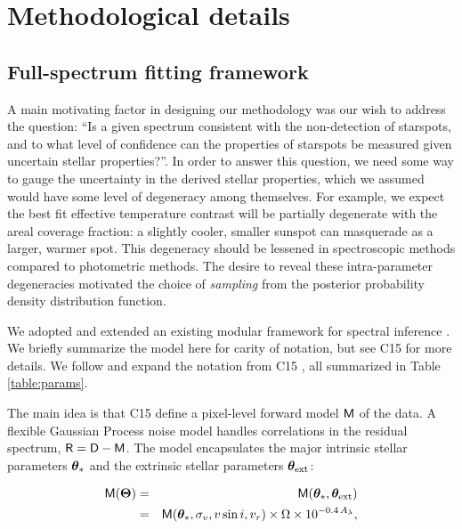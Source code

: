 \documentclass[twocolumn]{emulateapj}%
\newcommand{\iancze}{{\sc C15 }}
\begin{document}
\section{Methodological details}
\label{methods-details}

\subsection{Full-spectrum fitting framework}


A main motivating factor in designing our methodology was our wish to address the question: ``Is a given spectrum consistent with the non-detection of starspots, and to what level of confidence can the properties of starspots be measured given uncertain stellar properties?''.  In order to answer this question, we need some way to gauge the uncertainty in the derived stellar properties, which we assumed would have some level of degeneracy among themselves.  For example, we expect the best fit effective temperature contrast will be partially degenerate with the areal coverage fraction: a slightly cooler, smaller sunspot can masquerade as a larger, warmer spot.  This degeneracy should be lessened in spectroscopic methods compared to photometric methods.  The desire to reveal these intra-parameter degeneracies motivated the choice of \emph{sampling} from the posterior probability density distribution function.


We adopted and extended an existing modular framework for spectral inference \citep[][hereafter \iancze]{czekala15}.  We briefly summarize the model here for carity of notation, but see \iancze for more details.  We follow and expand the notation from \iancze, all summarized in Table \ref{table:params}. 

The main idea is that \iancze define a pixel-level forward model $\mathsf{M}$ of the data.  A flexible Gaussian Process noise model handles correlations in the residual spectrum, $\mathsf{R}= \mathsf{D} - \mathsf{M}$.  The model encapsulates the major intrinsic stellar parameters ${\bm \theta}_{\ast}$ and the extrinsic stellar parameters ${\bm \theta}_{\rm ext}$:

\begin{eqnarray} \label{eqn:scaling}
\mathsf{M}({\bm \Theta}) &=& \mathsf{M}({\bm \theta}_{\ast}, {\bm \theta}_{\rm ext}) \\
         &=& \mathsf{M}({\bm \theta}_{\ast}, \sigma_v, v\sin{i}, v_r) \times \Omega \times 10^{-0.4\,A_{\lambda}}, \nonumber
\end{eqnarray}
\end{document}
